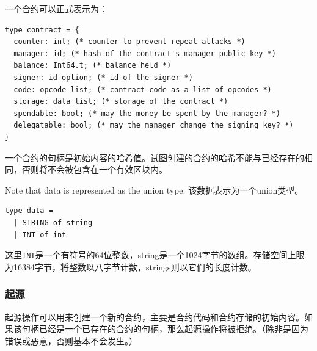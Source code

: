 \documentclass[letterpaper]{article}
\begin{document}
一个合约可以正式表示为：

\begin{lstlisting}
type contract = {
  counter: int; (* counter to prevent repeat attacks *)
  manager: id; (* hash of the contract's manager public key *)
  balance: Int64.t; (* balance held *)
  signer: id option; (* id of the signer *)
  code: opcode list; (* contract code as a list of opcodes *)
  storage: data list; (* storage of the contract *)
  spendable: bool; (* may the money be spent by the manager? *)
  delegatable: bool; (* may the manager change the signing key? *)
}
\end{lstlisting}

一个合约的句柄是初始内容的哈希值。试图创建的合约的哈希不能与已经存在的相同，否则将不会被包含在一个有效区块内。

Note that data is represented as the union type.
该数据表示为一个union类型。

\begin{lstlisting}
type data =
  | STRING of string
  | INT of int
\end{lstlisting}

这里\verb!INT!是一个有符号的64位整数，string是一个1024字节的数组。存储空间上限为\num{16384}字节，将整数以八字节计数，strings则以它们的长度计数。

\subsubsection{起源}

起源操作可以用来创建一个新的合约，主要是合约代码和合约存储的初始内容。如果该句柄已经是一个已存在的合约的句柄，那么起源操作将被拒绝。（除非是因为错误或恶意，否则基本不会发生。）
\end{document}

